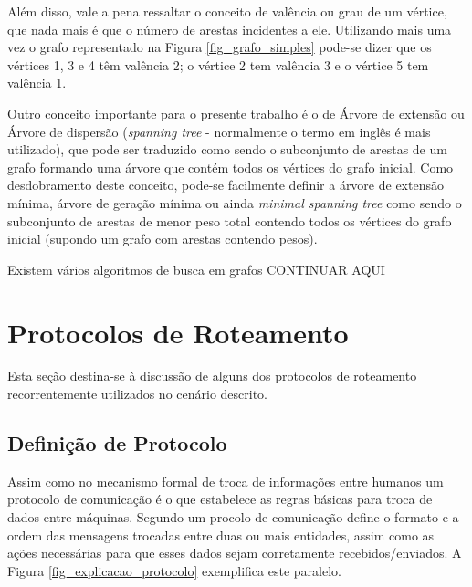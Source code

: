 Além disso, vale a pena ressaltar o conceito de valência ou grau de um vértice, que nada mais é que o número de arestas incidentes a ele. Utilizando mais uma vez o grafo representado na Figura \ref{fig_grafo_simples} pode-se dizer que os vértices 1, 3 e 4 têm valência 2; o vértice 2 tem valência 3 e o vértice 5 tem valência 1.

Outro conceito importante para o presente trabalho é o de Árvore de extensão ou Árvore de dispersão (\emph{spanning tree} - normalmente o termo em inglês é mais utilizado), que pode ser traduzido como sendo o subconjunto de arestas de um grafo formando uma árvore que contém todos os vértices do grafo inicial. Como desdobramento deste conceito, pode-se facilmente definir a árvore de extensão mínima, árvore de geração mínima ou ainda \emph{minimal spanning tree} como sendo o subconjunto de arestas de menor peso total contendo todos os vértices do grafo inicial (supondo um grafo com arestas contendo pesos).

Existem vários algoritmos de busca em grafos CONTINUAR AQUI



\section{Protocolos de Roteamento}
\label{cap_protocolos_de_roteamento}
Esta seção destina-se à discussão de alguns dos protocolos de roteamento recorrentemente utilizados no cenário descrito.

\subsection{Definição de Protocolo}
Assim como no mecanismo formal de troca de informações entre humanos um protocolo de comunicação é o que estabelece as regras básicas para troca de dados entre máquinas. Segundo \cite{Book-Kurose2013} um procolo de comunicação define o formato e a ordem das mensagens trocadas entre duas ou mais entidades, assim como as ações necessárias para que esses dados sejam corretamente recebidos/enviados. A Figura \ref{fig_explicacao_protocolo} exemplifica este paralelo.

